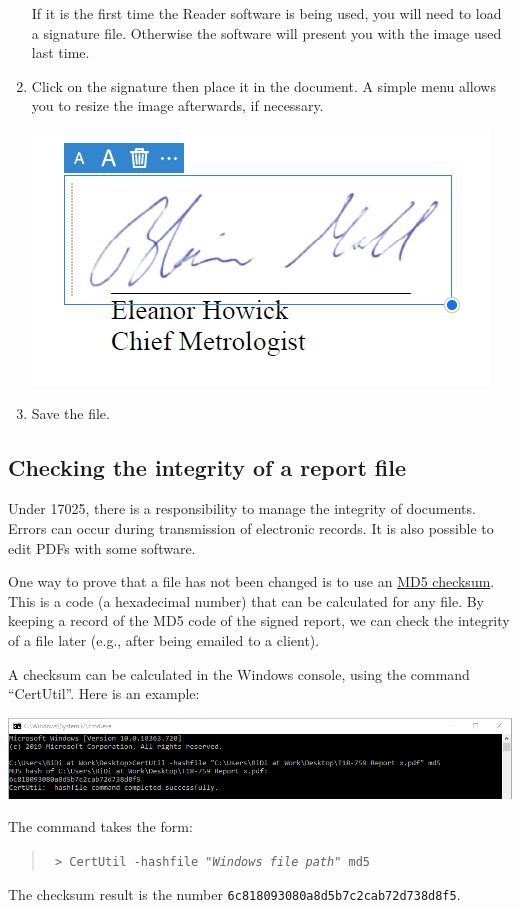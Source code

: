 \begin{enumerate}
If it is the first time the Reader software is being used, you will need to load a signature file. Otherwise the software will present you with the image used last time. 
\item Click on the signature then place it in the document. A simple menu allows you to resize the image afterwards, if necessary. 
\begin{center}
\includegraphics[scale=.6]{pictures/acrobat_signing_4}
\end{center}
\item Save the file.
\end{enumerate}

\subsection{Checking the integrity of a report file}
 \label{ss:file_integrity_md5}
Under 17025, there is a responsibility to manage the integrity of documents. Errors can occur during transmission of electronic records. It is also possible to edit PDFs with some software.

One way to prove that a file has not been changed is to use an \href{http://en.wikipedia.org/wiki/Md5sum}{MD5 checksum}. This is a code (a hexadecimal number) that can be calculated for any file. By keeping a record of the MD5 code of the signed report, we can check the integrity of a file later (e.g., after being emailed to a client). 

A checksum can be calculated in the Windows console, using the command ``CertUtil''. Here is an example:
\begin{center}
\includegraphics[scale=.6]{pictures/md5_cmd}
\end{center}
The command takes the form: 
\begin{quote}
\texttt{
> CertUtil -hashfile "\textit{Windows file path}" md5}
\end{quote}
The checksum result is the number \texttt{6c818093080a8d5b7c2cab72d738d8f5}.
 

